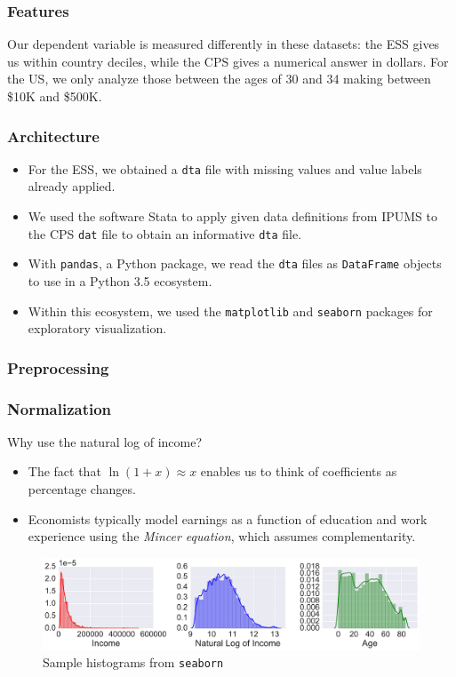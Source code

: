 \documentclass{beamer}
\let\olditem=\item
\renewcommand{\item}{\olditem \justifying}
\begin{document}
\frame %
{
  \frametitle{Features}
Our dependent variable is measured differently in these datasets: the ESS gives us within country deciles, while the CPS gives a numerical answer in dollars. For the US, we only analyze those between the ages of 30 and 34 making between \$10K and \$500K. 

}




\frame %
{
  \frametitle{Architecture}
  \begin{itemize}
  \item For the ESS, we obtained a \texttt{dta} file with missing values and value labels already applied.
  \item We used the software Stata to apply given data definitions from IPUMS to the CPS \texttt{dat} file to obtain an informative \texttt{dta} file.  
  \item With \texttt{pandas}, a Python package, we read the \texttt{dta} files as \texttt{DataFrame} objects to use in a Python 3.5 ecosystem.
  \item Within this ecosystem, we used the \texttt{matplotlib} and \texttt{seaborn} packages for exploratory visualization.
  \end{itemize}



  
}

\frame %
{
  \frametitle{Preprocessing}




}

\frame %
{
  \frametitle{Normalization}


\begin{block}{Why use the natural log of income?}
  \begin{itemize}
  \item The fact that $\ln(1+x) \approx x$ enables us to think of coefficients as percentage changes.
  \item Economists typically model earnings as a function of education and work experience using the \emph{Mincer equation}, which assumes complementarity.
  \end{itemize}
  \end{block}

\begin{figure}[htbp]
\begin{center}
\includegraphics[width=\textwidth]{example_histograms.pdf}

\caption{Sample histograms from \texttt{seaborn}}
\label{histograms}
\end{center}
\end{figure}

}
\end{document}
